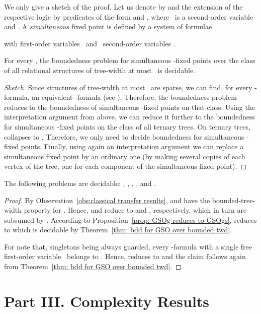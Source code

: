 \documentclass{LMCS}
\begin{document}
\begin{thm}
We only give a sketch of the proof.
Let us denote by  and  the extension
of the respective logic by predicates of the form
 and ,
where ~is a second-order variable and .
A \emph{simultaneous} fixed point is defined by a system of formulae

with first-order variables~ and ~second-order variables .
\begin{thm}\label{thm: bdd for GSO over bounded twd}
For every , the boundedness problem for simultaneous -fixed points
over the class of all relational structures of tree-width at most~
is decidable.
\end{thm}
\begin{proof}[Sketch]
Since structures of tree-width at most~ are sparse,
we can find, for every -formula, an equivalent -formula
(see \cite{Courcelle03,Blumensath10}).
Therefore, the boundedness problem reduces to the boundedness
of simultaneous -fixed points on that class.
Using the interpretation argument from above, we can reduce it further
to the boundedness for simultaneous -fixed points
on the class of all ternary trees. On ternary trees,
 collapses to .
Therefore, we only need to decide boundedness for simultaneous
-fixed points.
Finally, using again an interpretation argument we can replace
a simultaneous fixed point by an ordinary one (by making several copies of each vertex
of the tree, one for each component of the simultaneous fixed point).
\end{proof}
\begin{cor}\label{cor:decidability of BDD(GF), etc}
The following problems are decidable\?:
, , , , and\/
.
\end{cor}
\begin{proof}
By Observation~\ref{obs:classical transfer results},
 and  have the bounded-tree-width property for .
Hence,  and  reduce to  and , respectively,
which in turn are subsumed by .
According to Proposition~\ref{prop: GSOg reduces to GSOgs},
 reduces to  which is decidable
by Theorem~\ref{thm: bdd for GSO over bounded twd}.

For  note that, singletons being always guarded,
every -formula 
with a single free first-order variable~ belongs
to .
Hence,  reduces to 
and the claim follows again from Theorem~\ref{thm: bdd for GSO over bounded twd}.
\end{proof}


\bigskip
\section*{Part III. Complexity Results}


\end{thm}
\end{document}
